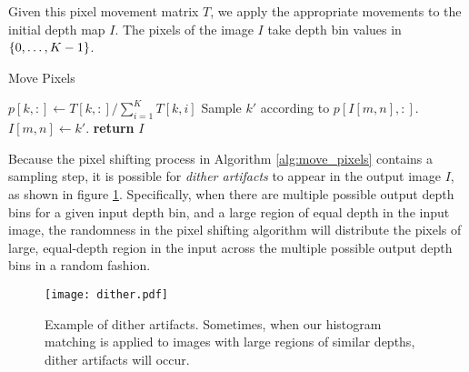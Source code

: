 \documentclass[runningheads]{llncs}
\begin{document}
Given this pixel movement matrix $T$, we apply the appropriate movements to the
initial depth map $I$. The pixels of the image $I$ take depth bin values in $\{0,\ldots,K-1\}$. 
{ \footnotesize
  \begin{algorithm}[H]
    \caption{Move Pixels}
    \label{alg:move_pixels}
    \begin{algorithmic}
      \footnotesize
        \State $p[k,:] \gets T[k,:]/\sum_{i=1}^K T[k,i]$
      \EndFor
          \State Sample $k'$ according to $p[I[m,n],:]$.
          \State $I[m,n] \gets k'$.
        \EndFor
      \EndFor
      \State \textbf{return} $I$
      \EndProcedure
    \end{algorithmic}
  \end{algorithm}
} Because the pixel shifting process in Algorithm \ref{alg:move_pixels} contains
a sampling step, it is possible for
\textit{dither artifacts} to appear in the output image $I$, as shown in figure
\ref{fig:dither}. Specifically, when there are multiple possible output depth
bins for a given input depth bin, and a large region of equal depth in the input
image, the randomness in the pixel shifting algorithm will distribute the pixels
of large, equal-depth region in the input across the multiple possible output
depth bins in a random fashion.

\begin{figure}[H]
  \centering \texttt{[image: dither.pdf]}
  \caption{Example of dither artifacts. Sometimes, when our histogram matching
    is applied to images with large regions of similar depths, dither artifacts
    will occur.}
  \label{fig:dither}
\end{figure}
\end{document}
